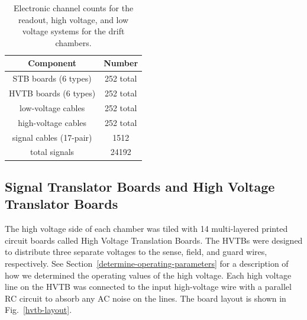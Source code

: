 \begin{table}[htbp]
\begin{center}
\begin{tabular} {||c|c||} \hline \hline
{\bf Component}           & {\bf Number} \\ \hline
STB boards (6 types)      & 252 total \\ \hline
HVTB boards (6 types)     & 252 total \\ \hline
low-voltage cables        & 252 total  \\ \hline
high-voltage cables       & 252 total  \\ \hline
signal cables (17-pair)   & 1512 \\ \hline
total signals             & 24192 \\ \hline \hline
\end{tabular}
\caption{\small{Electronic channel counts for the readout, high voltage,
and low voltage systems for the drift chambers.}}
\label{electronic-components}
\end{center}
\end{table}

\subsection{Signal Translator Boards and High Voltage Translator Boards}

The high voltage side of each chamber was tiled with 14  multi-layered printed circuit 
boards called High Voltage Translation Boards. The HVTBs were designed to distribute three
separate voltages to the sense, field, and guard wires, respectively.  See
Section~\ref{determine-operating-parameters} for a 
description of how we determined the operating values of the high voltage.  
Each high voltage line on the HVTB was connected to the 
input high-voltage wire with a parallel RC circuit to absorb any AC noise on
the lines.  The board layout is shown in Fig.~\ref{hvtb-layout}.

